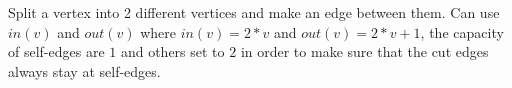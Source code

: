 Split a vertex into 2 different vertices and make an edge between them.
Can use $in(v)$ and $out(v)$ where $in(v) = 2*v$ and $out(v) = 2*v + 1$, the capacity of self-edges are $1$ and 
others set to $2$ in order to make sure that the cut edges always stay at self-edges.